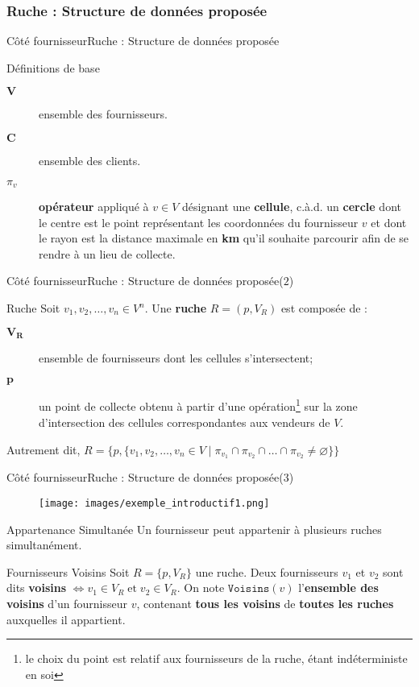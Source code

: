 \documentclass[usenames,dvipsnames]{beamer}
\begin{document}
\subsubsection*{Ruche : Structure de données proposée}
\begin{frame}{Côté fournisseur}{Ruche : Structure de données proposée}
\begin{block}{Définitions de base}
\begin{description}
  \item[$\textbf{V}$]{ensemble des fournisseurs.}
  \item[$\textbf{C}$]{ensemble des clients.}
  \item[$\pi_v$]{\textbf{opérateur} appliqué à $v \in V$ désignant une \textbf{cellule}, c.à.d. un \textbf{cercle} dont le centre est le point représentant les coordonnées du fournisseur $v$ et dont le rayon est la distance maximale en \textbf{km} qu'il souhaite parcourir afin de se rendre à un lieu de collecte.}
\end{description}
\end{block}
\end{frame}

\begin{frame}{Côté fournisseur}{Ruche : Structure de données proposée($2$)}
\begin{block}{Ruche}
Soit $v_1, v_2, \dots, v_n \in V^n$. Une \textbf{ruche} $R = (p, V_R)$ est composée de :
\begin{description}
  \item[$\mathbf{V_R}$]{ensemble de fournisseurs dont les cellules s'intersectent;}
  \item[$\mathbf{p}$]{un point de collecte obtenu à partir d'une opération\footnote{le choix du point est relatif aux fournisseurs de la ruche, étant indéterministe en soi} sur la zone d'intersection des cellules correspondantes aux vendeurs de $V$.}
\end{description}
Autrement dit, $R = \{p, \{v_1, v_2, \dots, v_n \in V\; |\; \pi_{v_1} \cap \pi_{v_2} \cap \dots \cap \pi_{v_2} \neq \varnothing\}\}$
\end{block}
\end{frame}

\begin{frame}{Côté fournisseur}{Ruche : Structure de données proposée($3$)}
\begin{figure}[!ht]
  \centering
  \texttt{[image: images/exemple\_introductif1.png]}
\end{figure}

\begin{block}{Appartenance Simultanée}
Un fournisseur peut appartenir à plusieurs ruches simultanément.
\end{block}

\begin{block}{Fournisseurs Voisins}
Soit $R = \{p, V_R\}$ une ruche. Deux fournisseurs $v_1$ et $v_2$ sont dits \textbf{voisins} $\iff v_1 \in V_R\; \text{et}\; v_2 \in V_R$. On note $\texttt{Voisins}(v)$ l'\textbf{ensemble des voisins} d'un fournisseur $v$, contenant \textbf{tous les voisins} de \textbf{toutes les ruches} auxquelles il appartient.
\end{block}
\end{frame}
\end{document}
